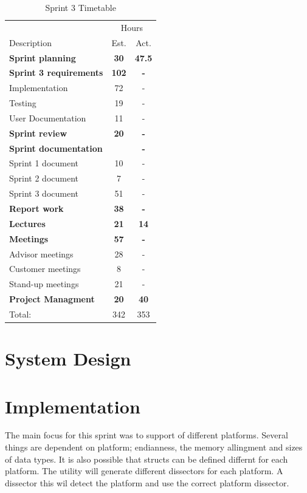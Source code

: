 \begin{table}[!htb] \small \center
\caption{Sprint 3 Timetable\label{tab:sprint3time}}
\begin{tabularx}{\textwidth}{X c c}
	\toprule
	& \multicolumn{2}{c}{Hours} \\
	\cmidrule(r){2-3}
	Description & Est. & Act. \\
	\midrule
	\textbf{Sprint planning} & \textbf{30} & \textbf{47.5} \\
	\addlinespace
	\textbf{Sprint 3 requirements} & \textbf{102} & \textbf{-} \\
	Implementation & 72 & - \\
	Testing & 19 & - \\
	User Documentation & 11 & - \\
	\addlinespace
	\textbf{Sprint review} & \textbf{20} & \textbf{-} \\
	\addlinespace
	\textbf{Sprint documentation} & \textbf{} & \textbf{-} \\
	Sprint 1 document & 10 & -\\
	Sprint 2 document & 7 & - \\
	Sprint 3 document & 51 & - \\
	\addlinespace
	\textbf{Report work} & \textbf{38} & \textbf{-} \\
	\addlinespace
	\textbf{Lectures} & \textbf{21} & \textbf{14} \\
	\addlinespace
	\textbf{Meetings} & \textbf{57} & \textbf{-} \\
	Advisor meetings & 28 & - \\
	Customer meetings & 8 & - \\
	Stand-up meetings & 21 & - \\
	\addlinespace
	\textbf{Project Managment} & \textbf{20} & \textbf{40} \\
	\midrule
	Total: & 342 & 353 \\
	\bottomrule
\end{tabularx}
\end{table}



\section{System Design}


\section{Implementation}
The main focus for this sprint was to support of different platforms. Several 
things are dependent on platform; endianness, the memory allingment and sizes 
of data types. It is also possible that structs can be defined differnt for 
each platform. The utility will generate different dissectors for each 
platform. A dissector this wil detect the platform and use the correct 
platform dissector.

